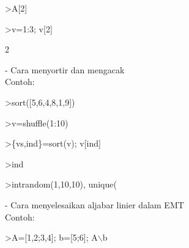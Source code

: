 \documentclass[a4paper,10pt]{article}
\begin{document}
\begin{eulernotebook}
\begin{eulercomment}
\begin{eulercomment}
\begin{eulerprompt}
>A[2]
\end{eulerprompt}
\begin{euleroutput}
  [4,  5,  6]
\end{euleroutput}
\begin{eulerprompt}
>v=1:3; v[2]
\end{eulerprompt}
\begin{euleroutput}
  2
\end{euleroutput}
\begin{eulercomment}
- Cara menyortir dan mengacak\\
Contoh:
\end{eulercomment}
\begin{eulerprompt}
>sort([5,6,4,8,1,9])
\end{eulerprompt}
\begin{euleroutput}
  [1,  4,  5,  6,  8,  9]
\end{euleroutput}
\begin{eulerprompt}
>v=shuffle(1:10)
\end{eulerprompt}
\begin{euleroutput}
  [7,  10,  1,  5,  3,  2,  4,  8,  9,  6]
\end{euleroutput}
\begin{eulerprompt}
>\{vs,ind\}=sort(v); v[ind]
\end{eulerprompt}
\begin{euleroutput}
  [1,  2,  3,  4,  5,  6,  7,  8,  9,  10]
\end{euleroutput}
\begin{eulerprompt}
>ind
\end{eulerprompt}
\begin{euleroutput}
  [3,  6,  5,  7,  4,  10,  1,  8,  9,  2]
\end{euleroutput}
\begin{eulerprompt}
>intrandom(1,10,10), unique(%
\end{eulerprompt}
\begin{euleroutput}
  [5,  4,  8,  4,  3,  1,  2,  4,  5,  4]
  [1,  2,  3,  4,  5,  8]
\end{euleroutput}
\begin{eulercomment}
- Cara menyelesaikan aljabar linier dalam EMT\\
Contoh:
\end{eulercomment}
\begin{eulerprompt}
>A=[1,2;3,4]; b=[5;6]; A\(\backslash\)b
\end{eulerprompt}
\begin{euleroutput}

\end{euleroutput}
\end{eulercomment}
\end{eulercomment}
\end{eulernotebook}
\end{document}
